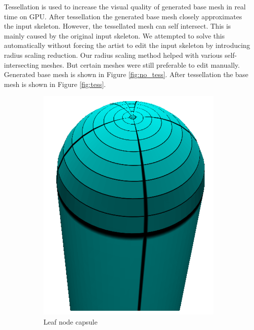 Tessellation is used to increase the visual quality of generated base mesh in real time on GPU.
After tessellation the generated base mesh closely approximates the input skeleton.
However, the tessellated mesh can self intersect.
This is mainly caused by the original input skeleton.
We attempted to solve this automatically without forcing the artist to edit the input skeleton by introducing radius scaling reduction.
Our radius scaling method helped with various self-intersecting meshes.
But certain meshes were still preferable to edit manually.
Generated base mesh is shown in Figure \ref{fig:no_tess}.
After tessellation the base mesh is shown in Figure \ref{fig:tess}.

\begin{figure}[h]
        \centering
        \begin{subfigure}[b]{0.25\textwidth}
                \includegraphics[height=\textwidth]{images/capsule.png}
                \caption{Leaf node capsule}
                \label{fig:caps}
        \end{subfigure}%
        \qquad %
        \begin{subfigure}[b]{0.4\textwidth}

\end{subfigure}
\end{figure}
